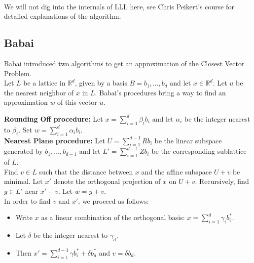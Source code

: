 \documentclass[a4paper,11pt]{article}
\begin{document}
\\

We will not dig into the internals of LLL here, see Chris Peikert's course\cite{chrispeikert} for detailed explanations of the algorithm.

\subsection{Babai}

Babai introduced two algorithms to get an approximation of the Closest Vector Problem.\\
Let $L$ be a lattice in $\mathbb{R}^d$, given by a basis $B = {b_1, \hdots, b_d}$ and let $x \in \mathbb{R}^d$. Let $u$ be the nearest neighbor of $x$ in $L$. Babai's procedures bring a way to find an approximation $w$ of this vector $u$.

\textbf{Rounding Off procedure:} Let $x = \sum^d_{i=1} \beta_i b_i$ and let $\alpha_i$ be the integer nearest to $\beta_i$. Set $w = \sum^d_{i=1} \alpha_i b_i$.\\

\textbf{Nearest Plane procedure:} Let $U = \sum^{d-1}_{i=1} R b_i$ be the linear subspace generated by $b_1, \hdots, b_{d-1}$ and let $L' = \sum^{d-1}_{i=1} Z b_i$ be the corresponding sublattice of $L$.\\
Find $v \in L$ such that the distance between $x$ and the affine subspace $U + v$ be minimal. Let $x'$ denote the orthogonal projection of $x$ on $U + v$. Recursively, find $y \in L'$ near $x' - v$. Let $w = y + v$.\\
In order to find $v$ and $x'$, we proceed as follows:
\begin{itemize}
\item Write $x$ as a linear combination of the orthogonal basis: $x = \sum^{d}_{i=1} \gamma_i b_i^{\ast}$.
\item Let $\delta$ be the integer nearest to $\gamma_d$.
\item Then $x' = \sum^{d-1}_{i=1} \gamma b_i^{\ast} + \delta b_d^{\ast}$ and $v = \delta b_d$.
\end{itemize}
\end{document}
